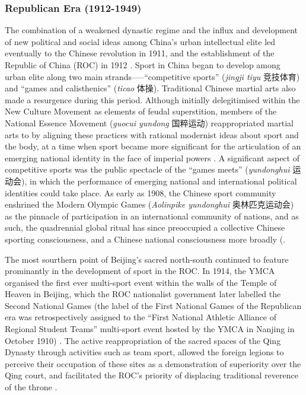 {\subsubsection{Republican Era (1912-1949)}
The combination of a weakened dynastic regime and the influx and development of new political and social ideas among China's urban intellectual elite led eventually to the Chinese revolution in 1911, and the establishment of the Republic of China (ROC) in 1912 \citep{Mitter2008}. Sport in China began to develop among urban elite along two main strands—--``competitive sports'' (\textit{jingji tiyu} 竞技体育) and ``games and calisthenics'' (\textit{ticao} 体操).  Traditional Chinese martial arts also made a resurgence during this period.  Although initially delegitimised within the New Culture Movement as elements of feudal superstition, members of the National Essence Movement (\textit{guocui yundong} 国粹运动) reappropriated martial arts to by aligning these practices with rational modernist ideas about sport and the body, at a time when sport became more significant for the articulation of an emerging national identity in the face of imperial powers \citep[38]{Brownell1995}\citep[45]{Morris2004}.  A significant aspect of competitive sports was the public spectacle of the ``games meets'' (\textit{yundonghui} 运动会), in which the performance of emerging national and international political identities could take place.  As early as 1908, the Chinese sport community enshrined the Modern Olympic Games (\textit{Aolinpike yundonghui} 奥林匹克运动会) as the pinnacle of participation in an international community of nations, and as such, the quadrennial global ritual has since preoccupied a collective Chinese sporting consciousness, and a Chinese national consciousness more broadly (\citep{Burnett2009;Barme2009;Brownell2008;Morris2004;Xu2008}.

The most sourthern point of Beijing's sacred north-south continued to feature prominantly in the development of sport in the ROC.  In 1914, the YMCA organised the first ever multi-sport event within the walls of the Temple of Heaven in Beijing, which the ROC nationalist government later labelled the Second National Games (the label of the First National Games of the Republican era was retrospectively assigned to the ``First National Athletic Alliance of Regional Student Teams'' multi-sport event hosted by the YMCA in Nanjing in October 1910) \citep[441]{Li2015}. The active reappropriation of the sacred spaces of the Qing Dynasty through activities such as team sport, allowed the foreign legions to perceive their occupation of these sites as a demonstration of superiority over the Qing court, and facilitated the ROC's priority of displacing traditional reverence of the throne \citep{Hevia1990}.

}
